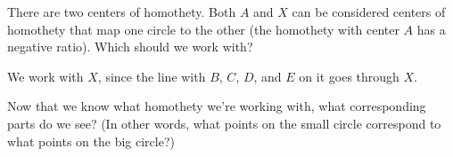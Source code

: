 


There are two centers of homothety. Both $A$ and $X$ can be considered centers of homothety that map one circle to the other (the homothety with center $A$ has a negative ratio). Which should we work with?







We work with $X$, since the line with $B$, $C$, $D$, and $E$ on it goes through $X$.


Now that we know what homothety we're working with, what corresponding parts do we see? (In other words, what points on the small circle correspond to what points on the big circle?)







